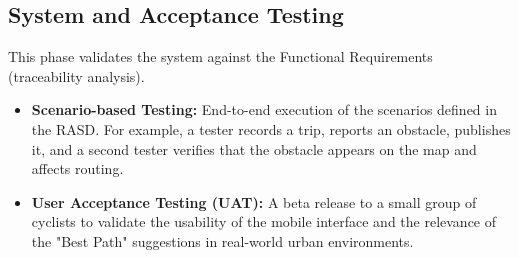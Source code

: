 \subsection{System and Acceptance Testing}
This phase validates the system against the Functional Requirements (traceability analysis).
\begin{itemize}
    \item \textbf{Scenario-based Testing:} End-to-end execution of the scenarios defined in the RASD. For example, a tester records a trip, reports an obstacle, publishes it, and a second tester verifies that the obstacle appears on the map and affects routing.
    \item \textbf{User Acceptance Testing (UAT):} A beta release to a small group of cyclists to validate the usability of the mobile interface and the relevance of the "Best Path" suggestions in real-world urban environments.
\end{itemize}

